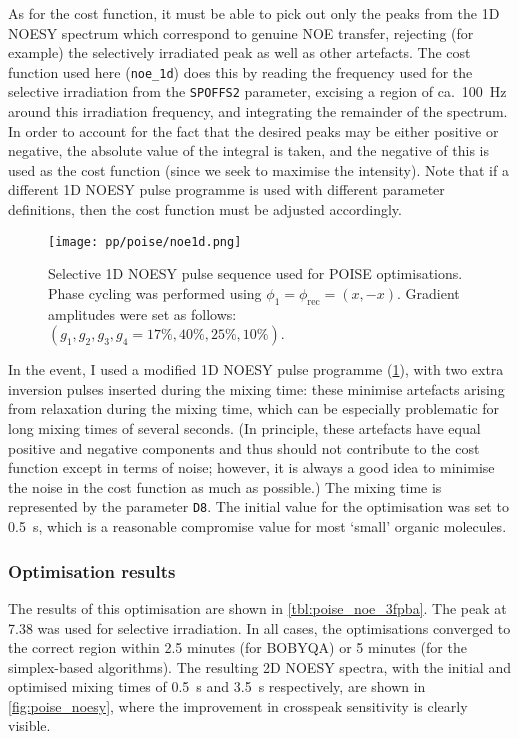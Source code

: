 As for the cost function, it must be able to pick out only the peaks from the 1D NOESY spectrum which correspond to genuine NOE transfer, rejecting (for example) the selectively irradiated peak as well as other artefacts.
The cost function used here (\texttt{noe\_1d}) does this by reading the frequency used for the selective irradiation from the \texttt{SPOFFS2} parameter, excising a region of ca.\ \qty{100}{\Hz} around this irradiation frequency, and integrating the remainder of the spectrum.
In order to account for the fact that the desired peaks may be either positive or negative, the absolute value of the integral is taken, and the negative of this is used as the cost function (since we seek to maximise the intensity).
Note that if a different 1D NOESY pulse programme is used with different parameter definitions, then the cost function must be adjusted accordingly.

\begin{figure}[!ht]
    \centering
    \texttt{[image: pp/poise/noe1d.png]}%
    \caption[1D NOESY pulse sequence used for optimisations]{
        Selective 1D NOESY pulse sequence used for POISE optimisations.
        Phase cycling was performed using $\phi_1 = \phi_\text{rec} = (x, -x)$.
        Gradient amplitudes were set as follows: $(g_1, g_2, g_3, g_4 = 17\%, 40\%, 25\%, 10\%)$.
    }
    \label{fig:noe1d_pulseq}
\end{figure}

In the event, I used a modified 1D NOESY pulse programme (\cref{fig:noe1d_pulseq}), with two extra inversion pulses inserted during the mixing time: these minimise artefacts arising from relaxation during the mixing time, which can be especially problematic for long mixing times of several seconds.
(In principle, these artefacts have equal positive and negative components and thus should not contribute to the cost function except in terms of noise; however, it is always a good idea to minimise the noise in the cost function as much as possible.)
The mixing time is represented by the parameter \texttt{D8}.
The initial value for the optimisation was set to \qty{0.5}{\s}, which is a reasonable compromise value for most `small' organic molecules.

\subsubsection{Optimisation results}

The results of this optimisation are shown in \cref{tbl:poise_noe_3fpba}.
The peak at \qty{7.38}{\ppm} was used for selective irradiation.
In all cases, the optimisations converged to the correct region within 2.5 minutes (for BOBYQA) or 5 minutes (for the simplex-based algorithms).
The resulting 2D NOESY spectra, with the initial and optimised mixing times of \qty{0.5}{\s} and \qty{3.5}{\s} respectively, are shown in \cref{fig:poise_noesy}, where the improvement in crosspeak sensitivity is clearly visible.

